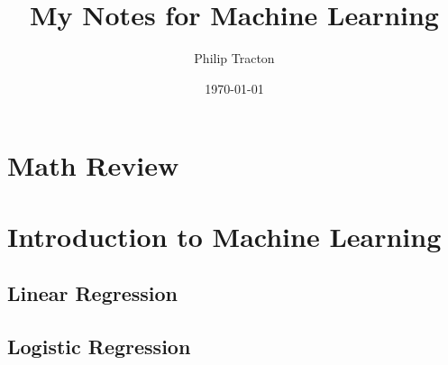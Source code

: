 \documentclass[12pt, svgnames, titlepage]{report}
\author{Philip Tracton}
\date{\today}
\date{}
\title{My Notes for Machine Learning}
\begin{document}
\maketitle
\newpage

\vspace{10mm}
\tableofcontents
\newpage

\chapter{Math Review}
\vspace{10mm}




\chapter{Introduction to Machine Learning}
\vspace{10mm}
\section{Linear Regression}
\section{Logistic Regression}
\end{document}
